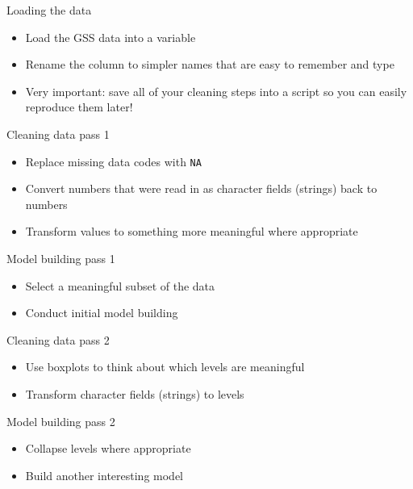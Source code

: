 \documentclass{beamer}\usepackage[]{graphicx}\usepackage[]{color}
\begin{document}
\begin{darkframes}
    \begin{frame}{Loading the data}
      \begin{itemize}
        \item Load the GSS data into a variable
        \item Rename the column to simpler names that are easy to remember and type
        \item \alert{Very important:} save all of your cleaning steps into a script so you can easily reproduce them later!
      \end{itemize}
    \end{frame}

    \begin{frame}{Cleaning data pass 1}
      \begin{itemize}
        \item Replace missing data codes with \texttt{NA}
        \item Convert numbers that were read in as character fields (strings) back to numbers
        \item Transform values to something more meaningful where appropriate
      \end{itemize}
    \end{frame}

    \begin{frame}{Model building pass 1}
      \begin{itemize}
        \item Select a meaningful subset of the data
        \item Conduct initial model building
      \end{itemize}
    \end{frame}

    \begin{frame}{Cleaning data pass 2}
      \begin{itemize}
        \item Use boxplots to think about which levels are meaningful
        \item Transform character fields (strings) to levels
      \end{itemize}
    \end{frame}

    \begin{frame}{Model building pass 2}
      \begin{itemize}
        \item Collapse levels where appropriate
        \item Build another interesting model
      \end{itemize}
    \end{frame}


\end{darkframes}
\end{document}
